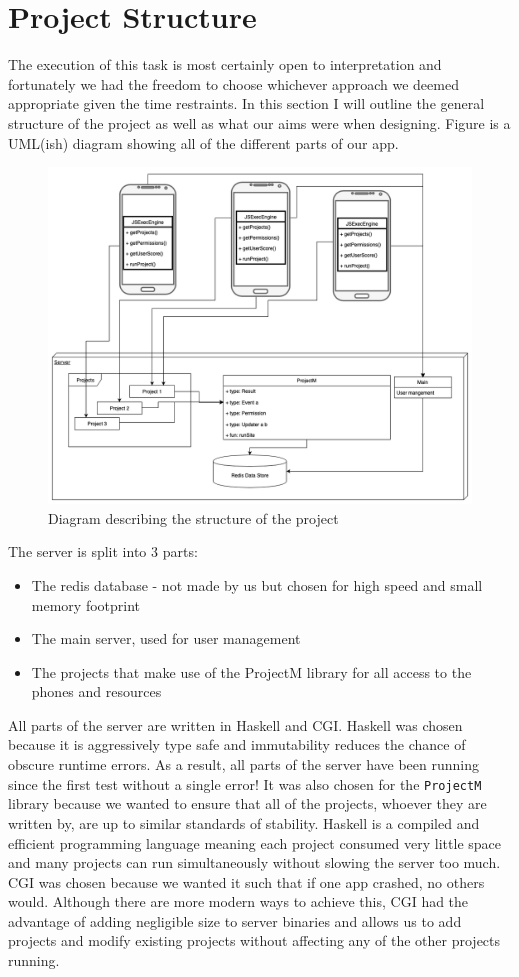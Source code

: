 \documentclass{article}
\begin{document}
\section{Project Structure}
The execution of this task is most certainly open to interpretation and fortunately we had the freedom to choose whichever
approach we deemed appropriate given the time restraints. In this section I will outline the general structure of the project as well
as what our aims were when designing. Figure  is a UML(ish) diagram showing all of the different parts of our app.
\begin{figure}[h]
  \caption{Diagram describing the structure of the project}
  \centering
  \includegraphics[width=1\textwidth]{DocFiles/ProjectM}
\end{figure}

The server is split into 3 parts: 
\begin{itemize}
  \item{The redis database - not made by us but chosen for high speed and small memory footprint} 
  \item{The main server, used for user management} 
  \item{The projects that make use of the ProjectM library for all access to the phones and resources}
\end{itemize}
All parts of the server are written in Haskell and CGI. Haskell was chosen because it is aggressively type safe and immutability reduces the
chance of obscure runtime errors. As a result, all parts of the server have been running since the first test without a single error! It
was also chosen for the \texttt{ProjectM} library because we wanted to ensure that all of the projects, whoever they are written by,
are up to similar standards of stability. Haskell is a compiled and efficient programming language meaning each project consumed very little space
and many projects can run simultaneously without slowing the server too much. CGI was chosen because we wanted it such that if one app crashed, no others would.
Although there are more modern ways to achieve this, CGI had the advantage of adding negligible size to server binaries and
allows us to add projects and modify existing projects without affecting any of the other projects running.
\end{document}
